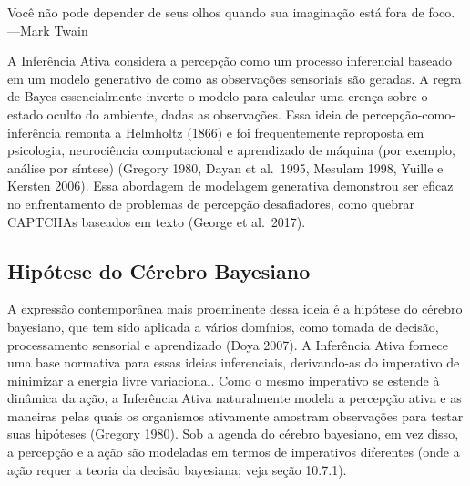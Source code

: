 \documentclass[
  12pt,
]{book}
\begin{document}
Você não pode depender de seus olhos quando sua imaginação está fora de foco. ---Mark Twain

A Inferência Ativa considera a percepção como um processo inferencial baseado em um modelo generativo de como as observações sensoriais são geradas. A regra de Bayes essencialmente inverte o modelo para calcular uma crença sobre o estado oculto do ambiente, dadas as observações. Essa ideia de percepção-como-inferência remonta a Helmholtz (1866) e foi frequentemente reproposta em psicologia, neurociência computacional e aprendizado de máquina (por exemplo, análise por síntese) (Gregory 1980, Dayan et al.~1995, Mesulam 1998, Yuille e Kersten 2006). Essa abordagem de modelagem generativa demonstrou ser eficaz no enfrentamento de problemas de percepção desafiadores, como quebrar CAPTCHAs baseados em texto (George et al.~2017).

\hypertarget{hipuxf3tese-do-cuxe9rebro-bayesiano}{%
\subsection{Hipótese do Cérebro Bayesiano}\label{hipuxf3tese-do-cuxe9rebro-bayesiano}}

A expressão contemporânea mais proeminente dessa ideia é a hipótese do cérebro bayesiano, que tem sido aplicada a vários domínios, como tomada de decisão, processamento sensorial e aprendizado (Doya 2007). A Inferência Ativa fornece uma base normativa para essas ideias inferenciais, derivando-as do imperativo de minimizar a energia livre variacional. Como o mesmo imperativo se estende à dinâmica da ação, a Inferência Ativa naturalmente modela a percepção ativa e as maneiras pelas quais os organismos ativamente amostram observações para testar suas hipóteses (Gregory 1980). Sob a agenda do cérebro bayesiano, em vez disso, a percepção e a ação são modeladas em termos de imperativos diferentes (onde a ação requer a teoria da decisão bayesiana; veja seção 10.7.1).
\end{document}
